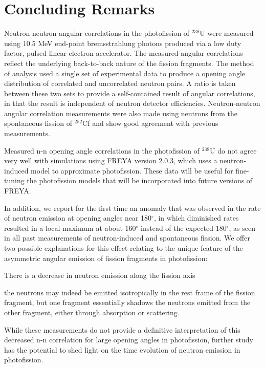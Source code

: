\documentclass[%
 reprint,
 amsmath,amssymb,
 aps,
 nofootinbib
]{revtex4-1}
\begin{document}
\section{Concluding Remarks}
Neutron-neutron angular correlations in the photofission of $^{238}$U were measured using 10.5 MeV end-point bremsstrahlung photons produced via a low duty factor, pulsed linear electron accelerator.
The measured angular correlations reflect the underlying back-to-back nature of the fission fragments.
The method of analysis used a single set of experimental data to produce a opening angle distribution of correlated and uncorrelated neutron pairs.
A ratio is taken between these two sets to provide a self-contained result of angular correlations, in that the result is independent of neutron detector efficiencies.
Neutron-neutron angular correlation measurements were also made using neutrons from the spontaneous fission of $^{252}$Cf and show good agreement with previous measurements.

Measured n-n opening angle correlations in the photofission of $^{238}$U do not agree very well with simulations using FREYA version 2.0.3, which uses a neutron-induced model to approximate photofission.
These data will be useful for fine-tuning the photofission models that will be incorporated into future versions of FREYA.

In addition, we report for the first time an anomaly that was observed in the rate of neutron emission at opening angles near 180$^{\circ}$, in which diminished rates resulted in a local maximum at about 160$^{\circ}$ instead of the expected 180$^{\circ}$, as seen in all past measurements of neutron-induced and spontaneous fission.
We offer two possible explanations for this effect relating to the unique feature of the asymmetric angular emission of fission fragments in photofission:
\begin{enumerate*}[label=(\roman*), itemjoin={{, }}, itemjoin*={{, or }}]
  \item There is a decrease in neutron emission along the fission axis
  \item the neutrons may indeed be emitted isotropically in the rest frame of the fission fragment, but one fragment essentially shadows the neutrons emitted from the other fragment, either through absorption or scattering.
  \end{enumerate*}
While these measurements do not provide a definitive interpretation of this decreased n-n correlation for large opening angles in photofission, further study has the potential to shed light on the time evolution of neutron emission in photofission.
\end{document}
